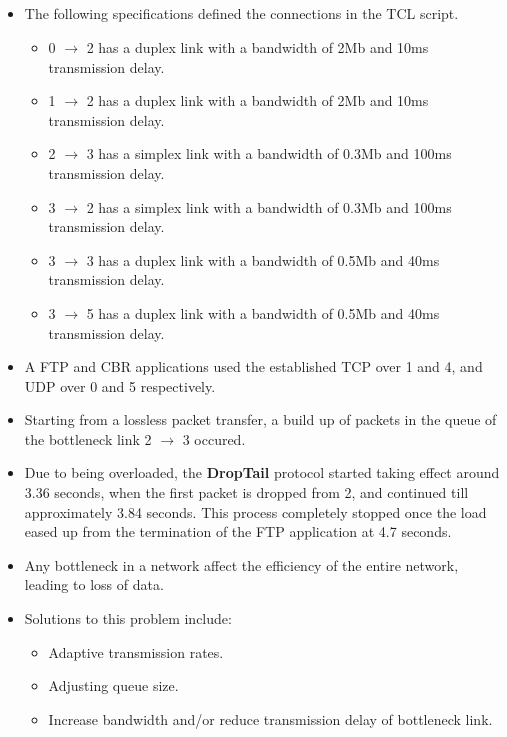 \documentclass[12pt,letterpaper]{article}
\begin{document}
\subsection*{}
\begin{flushleft}


\newpage
\subsection*{}
\begin{itemize}
	\item The following specifications defined the connections in the TCL script.
	\begin{itemize}
	\renewcommand\labelitemi{-}
		\item 0 $\longrightarrow$ 2 has a duplex link with a bandwidth of 2Mb and 10ms transmission delay.
		\item 1 $\longrightarrow$ 2 has a duplex link with a bandwidth of 2Mb and 10ms transmission delay.
		\item 2 $\longrightarrow$ 3 has a simplex link with a bandwidth of 0.3Mb and 100ms transmission delay.
		\item 3 $\longrightarrow$ 2 has a simplex link with a bandwidth of 0.3Mb and 100ms transmission delay.
		\item 3 $\longrightarrow$ 3 has a duplex link with a bandwidth of 0.5Mb and 40ms transmission delay.
		\item 3 $\longrightarrow$ 5 has a duplex link with a bandwidth of 0.5Mb and 40ms transmission delay.
	\end{itemize}
	\item A FTP and CBR applications used the established TCP over 1 and 4, and UDP over 0 and 5 respectively.
	\item Starting from a lossless packet transfer, a build up of packets in the queue of the bottleneck link 2 $\longrightarrow$ 3 occured.
	\item Due to being overloaded, the \textbf{DropTail} protocol started taking effect around 3.36 seconds, when the first packet is dropped from 2, and continued till approximately 3.84 seconds. This process completely stopped once the load eased up from the termination of the FTP application at 4.7 seconds.
	\item Any bottleneck in a network affect the efficiency of the entire network, leading to loss of data.
	\item Solutions to this problem include:
	\begin{itemize}
	\renewcommand\labelitemi{-}
		\item Adaptive transmission rates.
		\item Adjusting queue size.
		\item Increase bandwidth and/or reduce transmission delay of bottleneck link.
	\end{itemize}
\end{itemize}	


\end{flushleft}
\end{document}
